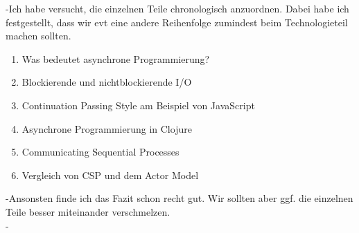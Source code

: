 
-Ich habe versucht, die einzelnen Teile chronologisch anzuordnen. Dabei habe ich festgestellt, dass wir evt eine andere Reihenfolge zumindest beim Technologieteil machen sollten.

\begin{enumerate}
\item Was bedeutet asynchrone Programmierung?
\item Blockierende und nichtblockierende I/O
\item Continuation Passing Style am Beispiel von JavaScript
\item Asynchrone Programmierung in Clojure
\item Communicating Sequential Processes
\item Vergleich von CSP und dem Actor Model
\end{enumerate}

-Ansonsten finde ich das Fazit schon recht gut. Wir sollten aber ggf. die einzelnen Teile besser miteinander verschmelzen. \\
-




